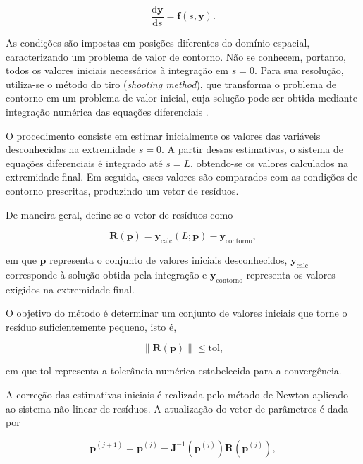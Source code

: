 \documentclass[arial,centeredequations,english,brazilian,oneside,section=TITLE]{ifes8}
\begin{document}
\begin{equation}
  \frac{\mathrm{d}\mathbf y}{\mathrm{d}s}=\mathbf f(s,\mathbf y).
  \label{eq:sistema-edo}
\end{equation}

As condições são impostas em posições diferentes do domínio espacial, caracterizando
um problema de valor de contorno. Não se conhecem, portanto, todos os valores
iniciais necessários à integração em $s=0$. Para sua resolução, utiliza-se o método do tiro
(\textit{shooting method}), que transforma o problema de contorno
em um problema de valor inicial, cuja solução pode ser obtida
mediante integração numérica das equações diferenciais \cite{Chapra2011}.

O procedimento consiste em estimar inicialmente os valores das
variáveis desconhecidas na extremidade $s=0$. A partir dessas
estimativas, o sistema de equações diferenciais é integrado até
$s=L$, obtendo-se os valores calculados na extremidade final.
Em seguida, esses valores são comparados com as condições de
contorno prescritas, produzindo um vetor de resíduos.

De maneira geral, define-se o vetor de resíduos como

\begin{equation}
  \mathbf{R}(\mathbf{p}) =
  \mathbf{y}_{\mathrm{calc}}(L;\mathbf{p}) -
  \mathbf{y}_{\mathrm{contorno}},
  \label{eq:residuo-tiro}
\end{equation}

em que $\mathbf{p}$ representa o conjunto de valores iniciais
desconhecidos, $\mathbf{y}_{\mathrm{calc}}$ corresponde à solução
obtida pela integração e $\mathbf{y}_{\mathrm{contorno}}$
representa os valores exigidos na extremidade final.

O objetivo do método é determinar um conjunto de valores iniciais
que torne o resíduo suficientemente pequeno, isto é,

\begin{equation}
  \left\|\mathbf{R}(\mathbf{p})\right\| \leq \mathrm{tol},
  \label{eq:criterio-tiro}
\end{equation}

em que $\mathrm{tol}$ representa a tolerância numérica estabelecida
para a convergência.

A correção das estimativas iniciais é realizada pelo método de
Newton aplicado ao sistema não linear de resíduos. A atualização
do vetor de parâmetros é dada por

\begin{equation}
  \mathbf{p}^{(j+1)}
  =
  \mathbf{p}^{(j)}
  -
  \mathbf{J}^{-1}
  \left(\mathbf{p}^{(j)}\right)
  \mathbf{R}\left(\mathbf{p}^{(j)}\right),
  \label{eq:newton-sistema}
\end{equation}
\end{document}
